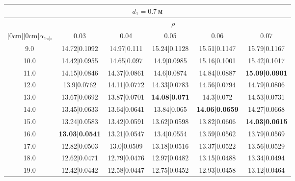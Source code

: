 \documentclass[20pt]{article}
\begin{document}
\begin{center}
\begin{tabular}{c|ccccc}
\hline
	\multicolumn{6}{c}{$d_{1}=0.7 \ м$} \\
\hline
	 & \multicolumn{5}{|c}{$\rho$} \\
	\cline{2-6}
	\raisebox{1.5ex}[0cm][0cm]{$\alpha_{1эф}$} & 0.03 & 0.04 & 0.05 & 0.06 & 0.07\\
\hline
	9.0 & 	14.72|0.1092 & 	14.97|0.111 & 	15.24|0.1128 & 	15.51|0.1147 & 	15.79|0.1167\\
	10.0 & 	14.42|0.0955 & 	14.65|0.097 & 	14.9|0.0985 & 	15.16|0.1001 & 	15.42|0.1017\\
	11.0 & 	14.15|0.0846 & 	14.37|0.0861 & 	14.6|0.0874 & 	14.84|0.0887 & 	\textbf{15.09|0.0901}\\
	12.0 & 	13.9|0.0762 & 	14.11|0.0772 & 	14.33|0.0783 & 	14.56|0.0794 & 	14.79|0.0806\\
	13.0 & 	13.67|0.0692 & 	13.87|0.0701 & 	\textbf{14.08|0.071} & 	14.3|0.072 & 	14.53|0.0731\\
	14.0 & 	13.45|0.0633 & 	13.64|0.0641 & 	13.84|0.065 & 	\textbf{14.06|0.0659} & 	14.27|0.0668\\
	15.0 & 	13.24|0.0583 & 	13.42|0.0591 & 	13.62|0.0598 & 	13.82|0.0606 & 	\textbf{14.03|0.0615}\\
	16.0 & 	\textbf{13.03|0.0541} & 	13.21|0.0547 & 	13.4|0.0554 & 	13.59|0.0562 & 	13.79|0.0569\\
	17.0 & 	12.82|0.0503 & 	13.0|0.0509 & 	13.18|0.0516 & 	13.37|0.0522 & 	13.56|0.0529\\
	18.0 & 	12.62|0.0471 & 	12.79|0.0476 & 	12.97|0.0482 & 	13.15|0.0488 & 	13.34|0.0494\\
	19.0 & 	12.42|0.0442 & 	12.58|0.0447 & 	12.75|0.0452 & 	12.93|0.0458 & 	13.12|0.0464\\
\end{tabular}


\end{center}
\end{document}
